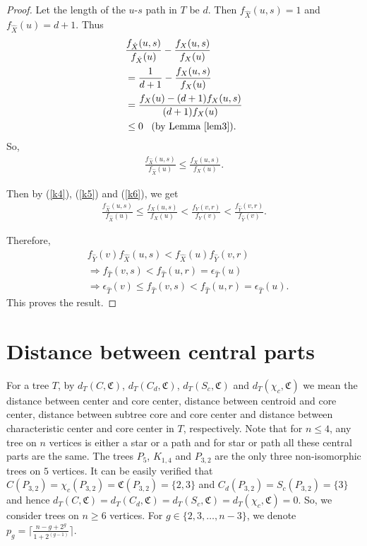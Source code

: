 \documentclass[11pt]{article}
\begin{document}
\begin{proof}
Let the length of the $u$-$s$ path in $T$ be $d$. Then $f_{\hat{X}}(u,s)=1$ and $f_{\hat{X}}(u)=d+1$. Thus 
\begin{align*} 
&\frac{ f_{\hat{X}}(u,s)}{f_{\hat{X}}(u)}- \frac{f_{X}(u,s)}{f_{X}(u)}\\
&=\frac{1}{d+1}-\frac{f_{X}(u,s)}{f_{X}(u)}\\
&=\frac{f_{X}(u)-(d+1)f_{X}(u,s)}{(d+1)f_{X}(u)}\\
&\leq 0 \;\;\;(\mbox{by Lemma \ref{lem3}}).
\end{align*}
So, 
\begin{align}\label{k6}
\frac{ f_{\hat{X}}(u,s)}{f_{\hat{X}}(u)}\leq \frac{ f_{X}(u,s)}{f_{X}(u)}.      
\end{align}

Then by (\ref{k4}), (\ref{k5}) and (\ref{k6}), we get 
\begin{align*}
 \frac{ f_{\hat{X}}(u,s)}{f_{\hat{X}}(u)}\leq \frac{ f_{X}(u,s)}{f_{X}(u)}<\frac{f_{Y}(v,r)}{f_{Y}(v)}< \frac {f_{\hat{Y}}(v,r)}{f_{\hat{Y}}(v)}. 
\end{align*}

Therefore, 
\begin{align*} 
&f_{\hat{Y}}(v)f_{\hat{X}}(u,s)<f_{\hat{X}}(u)f_{\hat{Y}}(v,r)\\
&\Rightarrow f_{\hat{T}}(v,s)<f_{\hat{T}}(u,r)=\epsilon_{\hat{T}}(u)\\
&\Rightarrow {{\epsilon}}_{\hat{T}}(v)\leq f_{\hat{T}}(v,s)<f_{\hat{T}}(u,r)=\epsilon_{\hat{T}}(u).
\end{align*}
This proves the result.
                         
\end{proof}

\section{Distance between central parts}\label{dcp}

For a tree $T$, by $d_T(C, \mathfrak{C})$, $d_T(C_d, \mathfrak{C})$, $d_T(S_c, \mathfrak{C})$ and $d_T(\chi_c, \mathfrak{C})$ we mean the distance between center and core center, distance between centroid and core center, distance between subtree core and core center and distance between characteristic center and core center in $T$, respectively. Note that for $n\leq 4$, any tree on $n$ vertices is either a star or a path and for star or path all these central parts are the same. The trees $P_5$, $K_{1,4}$ and $P_{3,2}$ are the only three non-isomorphic trees on $5$ vertices. It can be easily verified that $C(P_{3,2})=\chi_c(P_{3,2})=\mathfrak{C}(P_{3,2})=\{ 2, 3\}$ and $C_d(P_{3,2})=S_c(P_{3,2})=\{ 3 \}$ and hence  $d_T(C, \mathfrak{C})=d_T(C_d, \mathfrak{C})=d_T(S_c, \mathfrak{C})=d_T(\chi_c, \mathfrak{C})=0$. So, we consider trees on $n\geq 6$ vertices. For $g\in \{2,3,\ldots,n-3\}$, we denote $p_g=\lceil \frac{n-g+2^g}{1+2^{(g-1)}} \rceil$.
\end{document}

